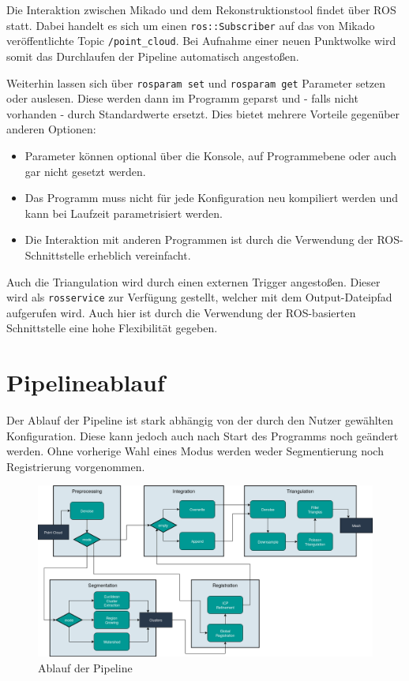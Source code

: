 Die Interaktion zwischen Mikado und dem Rekonstruktionstool findet über \ac{ROS} statt.
Dabei handelt es sich um einen \texttt{ros::Subscriber} auf das von Mikado veröffentlichte Topic \texttt{/point\_cloud}.
Bei Aufnahme einer neuen Punktwolke wird somit das Durchlaufen der Pipeline automatisch angestoßen.

Weiterhin lassen sich über \texttt{rosparam set} und \texttt{rosparam get} Parameter setzen oder auslesen.
Diese werden dann im Programm geparst und - falls nicht vorhanden - durch Standardwerte ersetzt.
Dies bietet mehrere Vorteile gegenüber anderen Optionen:

\begin{itemize}
\item Parameter können optional über die Konsole, auf Programmebene oder auch gar nicht gesetzt werden.
\item Das Programm muss nicht für jede Konfiguration neu kompiliert werden und kann bei Laufzeit parametrisiert werden.
\item Die Interaktion mit anderen Programmen ist durch die Verwendung der \ac{ROS}-Schnittstelle erheblich vereinfacht.
\end{itemize}

Auch die Triangulation wird durch einen externen Trigger angestoßen.
Dieser wird als \texttt{rosservice} zur Verfügung gestellt, welcher mit dem Output-Dateipfad aufgerufen wird.
Auch hier ist durch die Verwendung der \ac{ROS}-basierten Schnittstelle eine hohe Flexibilität gegeben.



\section{Pipelineablauf}
\label{sec:pipeline}

Der Ablauf der Pipeline ist stark abhängig von der durch den Nutzer gewählten Konfiguration.
Diese kann jedoch auch nach Start des Programms noch geändert werden.
Ohne vorherige Wahl eines Modus werden weder Segmentierung noch Registrierung vorgenommen.

\begin{figure}[H]
    \centering
	\includegraphics[width=\textwidth]{images/pipeline.png}
	\caption{Ablauf der Pipeline}
	\label{fig:pipeline}
\end{figure}

